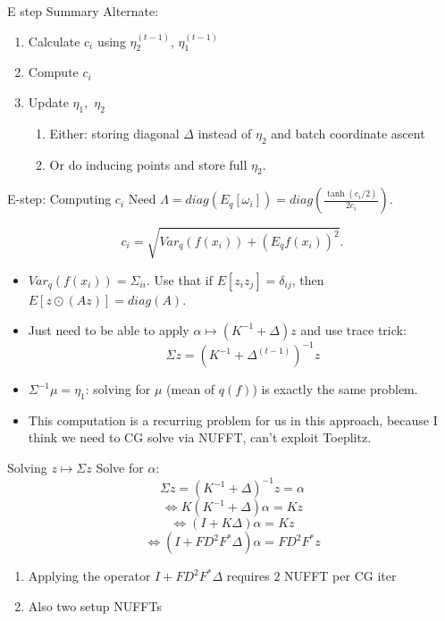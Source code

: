 \documentclass[aspectratio=169,xcolor=dvipsnames]{beamer}
\begin{document}
\begin{frame}{E step Summary}
Alternate:
\begin{enumerate}
    \item Calculate $c_i$ using $\eta_2^{(t-1)}$, $\eta_1^{(t-1)}$
    \item Compute $c_i$
    \item Update $\eta_1,$ $\eta_2$ 
    \begin{enumerate}
        \item Either: storing diagonal $\Delta$ instead of $\eta_2$ and batch coordinate ascent
        \item Or do inducing points and store full $\eta_2$.
    \end{enumerate}
\end{enumerate}
\end{frame}
\begin{frame}{E-step: Computing $c_i$}
    Need $\Lambda = diag (E_q[\omega_i]) = diag(\frac{\tanh (c_i/2)}{2c_i}).$

    $$c_i = \sqrt{Var_q (f(x_i)) + \left(E_q f(x_i)\right)^2}.$$

    \begin{itemize}
        \item $Var_q (f(x_i)) = \Sigma_{ii}$. Use that if $E[z_i z_j] = \delta_{ij}$, then $E[ z\odot (Az)] = diag(A)$. 
        \item Just need to be able to apply $\alpha \mapsto (K^{-1} + \Delta) z$ and use trace trick:
        $$\Sigma z = (K^{-1} + \Delta^{(t-1)})^{-1} z $$
        \item $\Sigma^{-1}\mu =\eta_1$: solving for $\mu$ (mean of $q(f)$) is exactly the same problem. 
        \item This computation is a recurring problem for us in this approach, because I think we need to CG solve via NUFFT, can't exploit Toeplitz. 
    \end{itemize}
\end{frame}

\begin{frame}{Solving $z\mapsto \Sigma z$}
Solve for $\alpha$: $$\Sigma z = (K^{-1} + \Delta)^{-1} z = \alpha$$
$$\iff K(K^{-1} + \Delta)\alpha = Kz$$
$$\iff (I + K\Delta)\alpha = Kz$$
$$\iff (I + FD^2 F^* \Delta)\alpha = FD^2 F^* z$$
\begin{enumerate}
    \item Applying the operator $I + FD^2 F^* \Delta$ requires $2$ NUFFT per CG iter
    \item Also two setup NUFFTs
\end{enumerate}
\end{frame}
\end{document}
